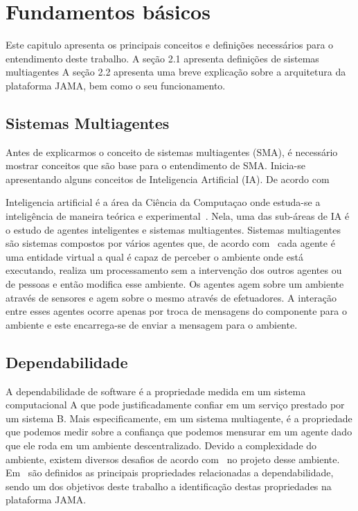 \chapter{Fundamentos básicos}

Este capitulo apresenta os principais conceitos e definições necessários para o entendimento deste trabalho. A seção 2.1 apresenta definições de sistemas multiagentes
A seção 2.2 apresenta uma breve explicação sobre a arquitetura da plataforma JAMA, bem como o seu funcionamento.

\section{Sistemas Multiagentes}

Antes de explicarmos o conceito de sistemas multiagentes (SMA), é necessário mostrar conceitos que são base para o entendimento de SMA. Inicia-se apresentando alguns conceitos de Inteligencia Artificial (IA). De acordo com 

Inteligencia artificial é a área da Ciência da Computaçao onde estuda-se a inteligência de maneira teórica e experimental~\cite{novig95}. Nela, uma das sub-áreas
de IA é o estudo de agentes inteligentes e sistemas multiagentes. Sistemas multiagentes são sistemas compostos por vários agentes que, de acordo com~\cite{wooldridge95}
cada agente é uma entidade virtual a qual é capaz de perceber o ambiente onde está executando, realiza um processamento
sem a intervenção dos outros agentes ou de pessoas e então modifica esse ambiente. Os agentes agem sobre um ambiente através de sensores e agem sobre o mesmo através
de efetuadores. A interação entre esses agentes ocorre apenas por troca de mensagens do componente para o ambiente e este encarrega-se de enviar a mensagem para o ambiente.


\section{Dependabilidade}

A dependabilidade de software é a propriedade medida em um sistema computacional A que pode justificadamente confiar em um serviço prestado por um sistema B. Mais especificamente,
em um sistema multiagente, é a propriedade que podemos medir sobre a confiança que podemos mensurar em um agente dado que ele roda em um ambiente descentralizado. Devido a complexidade
do ambiente, existem diversos desafios de acordo com~\cite{hoffman08} no projeto desse ambiente. Em~\cite{algirdas04} são definidos as principais propriedades relacionadas
a dependabilidade, sendo um dos objetivos deste trabalho a identificação destas propriedades na plataforma JAMA.

